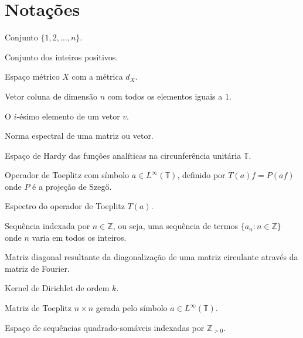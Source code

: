 \section*{Notações}

\begin{description}[leftmargin=!, labelwidth=\widthof{\texttt{Função $f : X \to Y$}}]
  \item[{$[n]$}] Conjunto $\{1, 2, \dots, n\}$.

  \item[$\mathbb{Z}_{>0}$] Conjunto dos inteiros positivos.

  \item[$(X, d_X)$] Espaço métrico $X$ com a métrica $d_X$.

  \item[$\mathbf{1}_n$] Vetor coluna de dimensão $n$ com todos os elementos iguais a $1$.

  \item[$(v)_i$] O $i$-ésimo elemento de um vetor $v$.

  \item[$\| \cdot \|_2$] Norma espectral de uma matriz ou vetor.

  \item[$H^2(\mathbb{T})$] Espaço de Hardy das funções analíticas na circunferência unitária $\mathbb{T}$.

  \item[$T(a)$] Operador de Toeplitz com símbolo $a \in L^\infty(\mathbb{T})$, definido por $T(a)f = P(af)$ onde $P$ é a projeção de Szegő.

  \item[$\sigma(T(a))$] Espectro do operador de Toeplitz $T(a)$.

  \item[$\{a_n\}$] Sequência indexada por \( n \in \mathbb{Z} \), ou seja, uma sequência de termos \( \{a_n : n \in \mathbb{Z}\} \) onde \( n \) varia em todos os inteiros.

  \item[$\Lambda$] Matriz diagonal resultante da diagonalização de uma matriz circulante através da matriz de Fourier.

  \item[$D_k(t)$] Kernel de Dirichlet de ordem $k$.

  \item[$T_n(a)$] Matriz de Toeplitz $n \times n$ gerada pelo símbolo $a \in L^\infty(\mathbb{T})$.

  \item[$l^2(\mathbb{Z}_{> 0})$] Espaço de sequências quadrado-somáveis indexadas por $\mathbb{Z}_{> 0}$.


\end{description}

